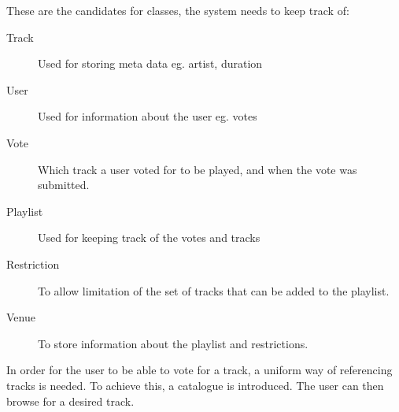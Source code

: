 These are the candidates for classes, the system needs to keep track of:
\begin{description}
    \item[Track]

    Used for storing meta data eg. artist, duration
    \item[User]

    Used for information about the user eg. votes
    \item[Vote]

    Which track a user voted for to be played, and when the vote was submitted.
    \item[Playlist]

    Used for keeping track of the votes and tracks
    \item[Restriction]

    To allow limitation of the set of tracks that can be added to the playlist.
    \item[Venue]

    To store information about the playlist and restrictions.
\end{description}

In order for the user to be able to vote for a track, a uniform way of referencing tracks is needed. To achieve this, a catalogue is introduced. The user can then browse for a desired track.
